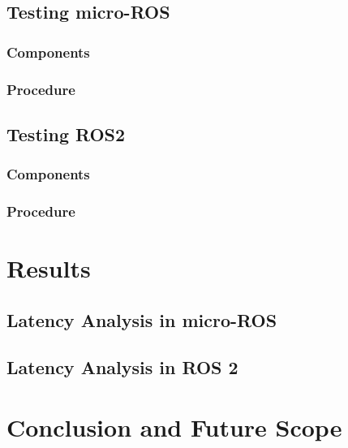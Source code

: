 \documentclass[%
xelatex,
	oneside,		%
	12pt,			%
	parskip=half,	%
	abstracton,
	chapterprefix=true%
    appendixprefix=true]
{scrbook}
\begin{document}
\rofoot[\pagemark]{\pagemark}

	\section{Testing micro-ROS}

	\subsection{Components}
	\subsection{Procedure}	

	\section{Testing ROS2}
	\subsection{Components}
	\subsection{Procedure}	


		\chapter{Results}
			
\rofoot[\pagemark]{\pagemark}
		\section{Latency Analysis in micro-ROS}
		\section{Latency Analysis in ROS 2}
		
		
		\chapter{Conclusion and Future Scope}
			
\rofoot[\pagemark]{\pagemark}
	\listoffigures
	\listoftables
		
		

\end{document}
